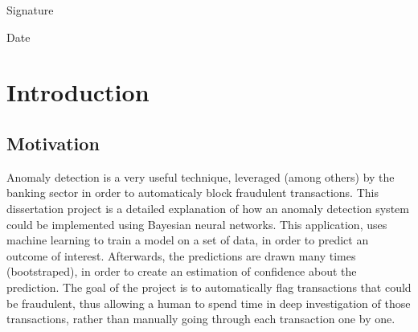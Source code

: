 \documentclass[11pt,twoside]{article}
\numberwithin{Theorem}{section}
\numberwithin{Definition}{section}
\numberwithin{Lemma}{section}
\numberwithin{Algorithm}{section}
\numberwithin{equation}{section}
\newcommand{\dottedline}[1]{\makebox[#1]{.\dotfill}}
\begin{document}
Signature \dottedline{8cm}

\vspace{5mm}

Date \dottedline{8cm}


\clearpage



\pagestyle{plain}
\setcounter{page}{1}

\tableofcontents
\clearpage
\listoftables
\listoffigures
\cleardoublepage

\setcounter{page}{1}

\nocite{*}

\clearpage

\section{Introduction}

\subsection{Motivation}
\label{sec:motivation}
Anomaly detection is a very useful technique, leveraged (among others) by the banking sector in order to automaticaly block fraudulent transactions. This dissertation project is a detailed explanation of how an anomaly detection system could be implemented using Bayesian neural networks. This application, uses machine learning to train a model on a set of data, in order to predict an outcome of interest. Afterwards, the predictions are drawn many times (bootstraped), in order to create an estimation of confidence about the prediction. The goal of the project is to automatically flag transactions that could be fraudulent, thus allowing a human to spend time in deep investigation of those transactions, rather than manually going through each transaction one by one. 
\end{document}
